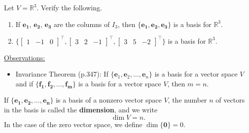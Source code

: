 \documentclass[20pt,a4paper]{extarticle}
\newcounter{example}
\newcounter{definition}
\begin{document}
\begin{example}
Let $V = \mathbb{R}^3$. Verify the following.
	\begin{enumerate}[label=\alph*)]
		\item If $\mathbf{e_1}$, $\mathbf{e_2}$, $\mathbf{e_3}$ are the columns of $I_3$, then $\{ \mathbf{e_1} , \mathbf{e_2} , \mathbf{e_3} \}$ is a basis for $\mathbb{R}^3$.
		\item $\{ \begin{bmatrix} 1 & -1 & 0 \end{bmatrix}^\top , \begin{bmatrix} 3 & 2 & -1 \end{bmatrix}^\top , \begin{bmatrix} 3 & 5 & -2 \end{bmatrix}^\top \}$ is a basis for $\mathbb{R}^3$.
	\end{enumerate}
\end{example}

\newpage 

\phantom{2}

\vfill 

\underline{Observations:}
	\begin{itemize}
		\item Invariance Theorem (p.347): If $\{ \mathbf{e}_1 , \mathbf{e}_2 , \ldots , \mathbf{e}_n \}$ is a basis for a vector space $V$ and if $\{ \mathbf{f_1} , \mathbf{f_2} , \ldots , \mathbf{f_m} \}$ is a basis for a vector space $V$, then $m = n$.
	\end{itemize}


\newpage 

\begin{definition}
If $\{ \mathbf{e_1} , \mathbf{e_2} , \ldots , \mathbf{e_n} \}$ is a basis of a nonzero vector space $V$, the number $n$ of vectors in the basis is called the \textbf{dimension}, and we write
	\[
		\dim V = n .
	\]
In the case of the zero vector space, we define $\dim \{ \mathbf{0} \} = 0$. 
\end{definition}
\end{document}
